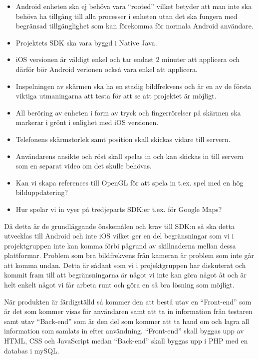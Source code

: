 \begin{itemize}
	\item Android enheten ska ej behöva vara “rooted” vilket betyder att man inte ska behöva ha tillgång till alla processer i enheten utan det ska fungera med begränsad tillgänglighet som kan 	förekomma för normala Android användare.
	\item Projektets SDK ska vara byggd i Native Java.
	\item iOS versionen är väldigt enkel och tar endast 2 minuter att applicera och därför bör Android verionen också vara enkel att applicera.
	\item Inspelningen av skärmen ska ha en stadig bildfrekvens och är en av de första viktiga utmaningarna att testa för att se att projektet är möjligt.
	\item All beröring av enheten i form av tryck och fingerrörelser på skärmen ska markerar i grönt i enlighet med iOS versionen.
	\item Telefonens skärmstorlek samt position skall skickas vidare till servern.
	\item Användarens ansikte och röst skall spelas in och kan skickas in till servern som en separat video om det skulle behövas.
	\item Kan vi skapa references till OpenGL för att spela in t.ex. spel med en hög bilduppdatering?
	\item Hur spelar vi in vyer på tredjeparts SDK:er t.ex. för Google Maps?
\end{itemize}


Då detta är de grundläggande önskemålen och krav till SDK:n så ska detta utvecklas till Android och inte iOS vilket ger en del begränsningar som vi i projektgruppen inte kan komma förbi pågrund av skillnaderna mellan dessa plattformar. Problem som bra bildfrekvens från kameran är problem som inte går att komma undan. Detta är sådant som vi i projektgruppen har diskuterat och kommit fram till att begränsningarna är något vi inte kan göra något åt och är helt enkelt något vi får arbeta runt och göra en så bra lösning som möjligt.


När produkten är färdigställd så kommer den att bestå utav en “Front-end” som är det som kommer visas för användaren samt att ta in information från testaren samt utav “Back-end” som är den del som kommer att ta hand om och lagra all information som samlats in efter användning. “Front-end” skall byggas upp av HTML, CSS och JavaScript medan “Back-end” skall byggas upp i PHP med en databas i mySQL. \parencite{catalog}


